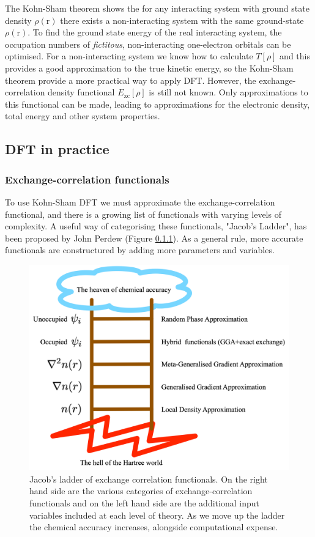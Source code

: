 The Kohn-Sham theorem shows the for any interacting system with ground state density $\rho(\textrm{r})$ there exists a non-interacting system with the same ground-state $\rho(\textrm{r})$. To find the ground state energy of the real interacting system, the occupation numbers of \textit{fictitous}, non-interacting one-electron orbitals can be optimised. For a non-interacting system we know how to calculate $T\left[\rho\right]$ and this provides a good approximation to the true kinetic energy, so the Kohn-Sham theorem provide a more practical way to apply DFT. However, the exchange-correlation density functional $E_{\textrm{xc}}\left[\rho\right]$ is still not known. Only approximations to this functional can be made, leading to approximations for the electronic density, total energy and other system properties.


\subsection{DFT in practice}

\subsubsection{Exchange-correlation functionals}
To use Kohn-Sham DFT we must approximate the exchange-correlation functional, and there is a growing list of functionals with varying levels of complexity. A useful way of categorising these functionals, "Jacob's Ladder", has been proposed by John Perdew (Figure \ref{}). As a general rule, more accurate functionals are constructured by adding more parameters and variables.

\begin{figure}[h]
\centering
  \includegraphics[width=0.5\columnwidth]{figures/ch3/jladder.png}
  \caption[Jacob's ladder of exchange-correlation functionals]{Jacob's ladder of exchange correlation functionals. On the right hand side are the various categories of exchange-correlation functionals and on the left hand side are the additional input variables included at each level of theory. As we move up the ladder the chemical accuracy increases, alongside computational expense.}
  \label{decouple}
\end{figure}

